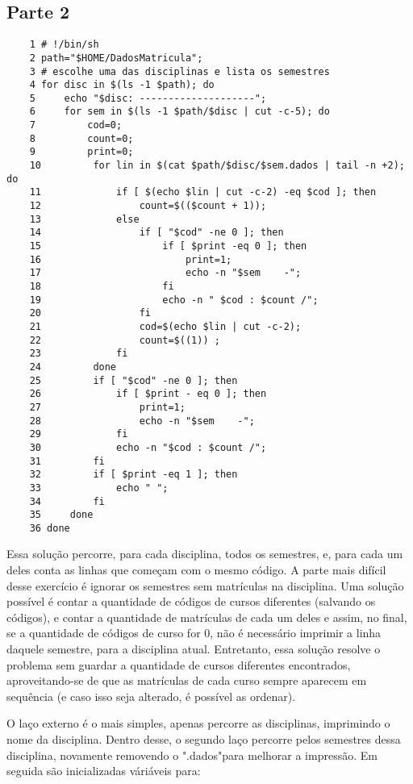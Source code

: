 \documentclass[oneside, 11 pt]{article}
\begin{document}
	\pagebreak

	\subsection{Parte 2}
	
	\begin{lstlisting}
	1 # !/bin/sh
	2 path="$HOME/DadosMatricula";
	3 # escolhe uma das disciplinas e lista os semestres
	4 for disc in $(ls -1 $path); do
	5     echo "$disc: --------------------";
	6     for sem in $(ls -1 $path/$disc | cut -c-5); do
	7         cod=0;
	8         count=0;
	9         print=0;
	10         for lin in $(cat $path/$disc/$sem.dados | tail -n +2); do
	11             if [ $(echo $lin | cut -c-2) -eq $cod ]; then
	12                 count=$(($count + 1));
	13             else
	14                 if [ "$cod" -ne 0 ]; then
	15                     if [ $print -eq 0 ]; then
	16                         print=1;
	17                         echo -n "$sem    -";
	18                     fi
	19                     echo -n " $cod : $count /";
	20                 fi
	21                 cod=$(echo $lin | cut -c-2);
	22                 count=$((1)) ;
	23             fi
	24         done
	25         if [ "$cod" -ne 0 ]; then
	26             if [ $print - eq 0 ]; then
	27                 print=1;
	28                 echo -n "$sem    -";
	29             fi
	30             echo -n "$cod : $count /";
	31         fi
	32         if [ $print -eq 1 ]; then
	33             echo " ";
	34         fi
	35     done
	36 done
	\end{lstlisting}
	
	Essa solução percorre, para cada disciplina, todos os semestres, e, para cada um deles conta as linhas que começam com o mesmo código. A parte mais difícil desse exercício é ignorar os semestres sem matrículas na disciplina. Uma solução possível é contar a quantidade de códigos de cursos diferentes (salvando os códigos), e contar a quantidade de matrículas de cada um deles e assim, no final, se a quantidade de códigos de curso for 0, não é necessário imprimir a linha daquele semestre, para a disciplina atual. Entretanto, essa solução resolve o problema sem guardar a quantidade de cursos diferentes encontrados, aproveitando-se de que as matrículas de cada curso sempre aparecem em sequência (e caso isso seja alterado, é possível as ordenar).
	
	O laço externo é o mais simples, apenas percorre as disciplinas, imprimindo o nome da disciplina. Dentro desse, o segundo laço percorre pelos semestres dessa disciplina, novamente removendo o ".dados"para melhorar a impressão. Em seguida são inicializadas váriáveis para:
	
\end{document}
